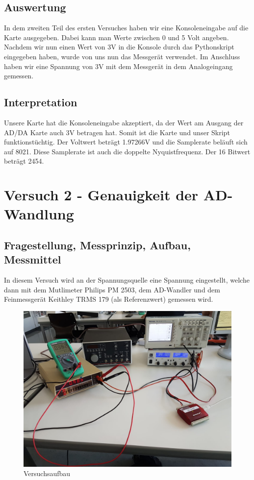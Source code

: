 \documentclass[12pt, oneside, a4paper, \docLanguage]{report}
\begin{document}
\section{Auswertung}
\label{chap:VERSUCH_1_AUSWERTUNG}
In dem zweiten Teil des ersten Versuches haben wir eine Konsoleneingabe auf die Karte ausgegeben. Dabei kann man Werte zwischen 0 und 5 Volt angeben.
\newline
Nachdem wir nun einen Wert von 3V in die Konsole durch das Pythonskript eingegeben haben, wurde von uns nun das Messgerät verwendet.
\newline
Im Anschluss haben wir eine Spannung von 3V mit dem Messgerät in dem Analogeingang gemessen.
\section{Interpretation}
\label{chap:VERSUCH_1_INTERPRETATION}
Unsere Karte hat die Konsoleneingabe akzeptiert, da der Wert am Ausgang der AD/DA Karte auch 3V betragen hat.
Somit ist die Karte und unser Skript funktionstüchtig.
\newline
\newline
Der Voltwert beträgt 1.97266V und die Samplerate beläuft sich auf 8021. Diese Samplerate ist auch die doppelte Nyquistfrequenz.
Der 16 Bitwert beträgt 2454.

%
%
\chapter{Versuch 2 - Genauigkeit der AD-Wandlung}
\label{chap:VERSUCH_2}

\section{Fragestellung, Messprinzip, Aufbau, Messmittel}
\label{chap:VERSUCH_2_FRAGESTELLUNG}
In diesem Versuch wird an der Spannungsquelle eine Spannung eingestellt, welche dann mit dem Mutlimeter Philips PM 2503, dem AD-Wandler und dem Feinmessgerät Keithley TRMS 179 (als Referenzwert) gemessen wird.
\begin{figure}[H]
	\centering\small
	\graphicspath{ {../versuch5/} }
	\includegraphics[width=.65\textwidth]{media/versuch2}
	\caption{Versuchsaufbau}
	\label{fig:V2}
\end{figure}
\end{document}
